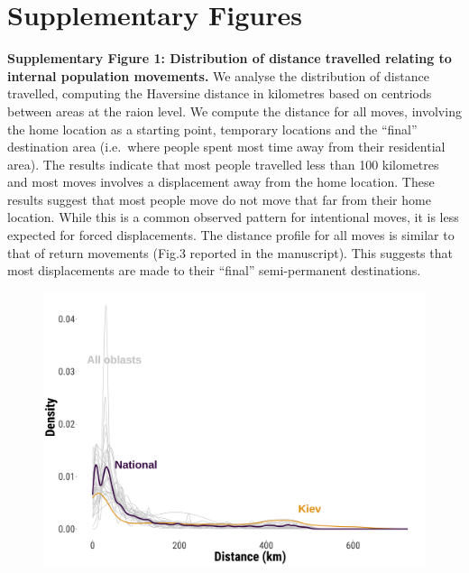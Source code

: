 \documentclass[
  11pt,
]{article}
\begin{document}
\newpage

\section{Supplementary Figures}\label{supplementary-figures}

\textbf{Supplementary Figure 1: Distribution of distance travelled
relating to internal population movements.} We analyse the distribution
of distance travelled, computing the Haversine distance in kilometres
based on centriods between areas at the raion level. We compute the
distance for all moves, involving the home location as a starting point,
temporary locations and the ``final'' destination area (i.e.~where
people spent most time away from their residential area). The results
indicate that most people travelled less than 100 kilometres and most
moves involves a displacement away from the home location. These results
suggest that most people move do not move that far from their home
location. While this is a common observed pattern for intentional moves,
it is less expected for forced displacements. The distance profile for
all moves is similar to that of return movements (Fig.3 reported in the
manuscript). This suggests that most displacements are made to their
``final'' semi-permanent destinations.

\begin{figure}[h]

\begin{minipage}{\linewidth}

\begin{center}
\includegraphics[width=5.20833in,height=\textheight]{../outputs/sm/distance_all-moves.png}
\end{center}

\end{minipage}%

\end{figure}%
\end{document}
